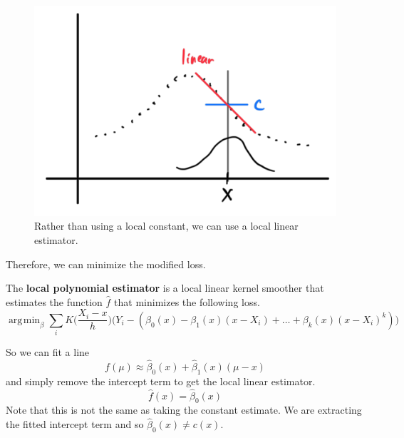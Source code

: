 \documentclass{article}
\DeclareMathOperator*{\argmin}{\arg\!\min}
\begin{document}
  \begin{figure}[H]
    \centering 
    \includegraphics[scale=0.4]{img/local_linear_estimator.png}
    \caption{Rather than using a local constant, we can use a local linear estimator.} 
    \label{fig:local_linear_estimator}
  \end{figure}

  Therefore, we can minimize the modified loss. 

  \begin{definition}
    The \textbf{local polynomial estimator} is a local linear kernel smoother that estimates the function $\hat{f}$ that minimizes the following loss. 
    \begin{equation}
      \argmin_{\beta} \sum_i K \bigg( \frac{X_i - x}{h} \bigg) \big( Y_i - (\beta_0 (x) - \beta_1 (x) (x- X_i) + \ldots + \beta_k (x) (x - X_i)^k )\big)
    \end{equation}
  \end{definition}

  So we can fit a line 
  \begin{equation}
    f(\mu) \approx \hat{\beta}_0 (x) + \hat{\beta}_1 (x) (\mu - x)
  \end{equation}
  and simply remove the intercept term to get the local linear estimator. 
  \begin{equation}
    \hat{f}(x) = \hat{\beta}_0 (x)
  \end{equation}
  Note that this is not the same as taking the constant estimate. We are extracting the fitted intercept term and so $\hat{\beta}_0(x) \neq c(x)$. 
\end{document}
